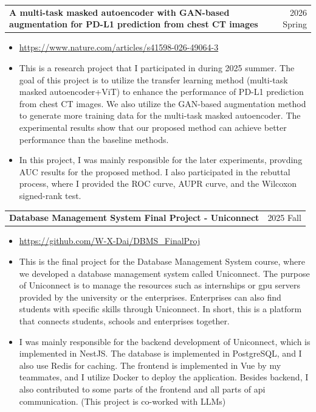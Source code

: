 \documentclass[11pt]{article}
\begin{document}
\noindent
\begin{tabularx}{\textwidth}{Xr}
    \textbf{A multi-task masked autoencoder with GAN-based augmentation for PD-L1 prediction from chest CT images} & 2026 Spring
\end{tabularx}
\begin{itemize}
    \item \href{https://www.nature.com/articles/s41598-026-49064-3}{https://www.nature.com/articles/s41598-026-49064-3}
    \item This is a research project that I participated in during 2025 summer. The goal of this project is to utilize the transfer learning method (multi-task masked autoencoder+ViT) to enhance the performance of PD-L1 prediction from chest CT images. We also utilize the GAN-based augmentation method to generate more training data for the multi-task masked autoencoder. The experimental results show that our proposed method can achieve better performance than the baseline methods.
    \item In this project, I was mainly responsible for the later experiments, provding AUC results for the proposed method. I also participated in the rebuttal process, where I provided the ROC curve, AUPR curve, and the Wilcoxon signed-rank test.
\end{itemize}
\begin{tabularx}{\textwidth}{Xr}
\textbf{Database Management System Final Project - Uniconnect} & 2025 Fall
\end{tabularx}
\begin{itemize}
    \item \href{https://github.com/W-X-Dai/DBMS_FinalProj}{https://github.com/W-X-Dai/DBMS\_FinalProj}
    \item This is the final project for the Database Management System course, where we developed a database management system called Uniconnect. The purpose of Uniconnect is to manage the resources such as internships or gpu servers provided by the university or the enterprises. Enterprises can also find students with specific skills through Uniconnect. In short, this is a platform that connects students, schools and enterprises together.
    \item I was mainly responsible for the backend development of Uniconnect, which is implemented in NestJS. The database is implemented in PostgreSQL, and I also use Redis for caching. The frontend is implemented in Vue by my teammates, and I utilize Docker to deploy the application. Besides backend, I also contributed to some parts of the frontend and all parts of api communication. (This project is co-worked with LLMs)
\end{itemize}
\end{document}
